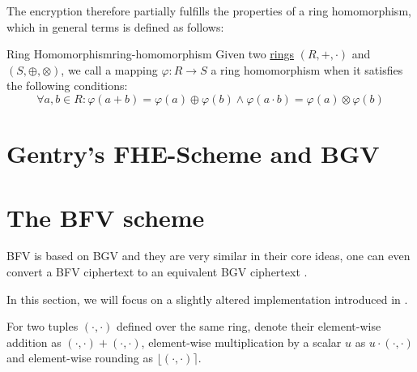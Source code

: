 The encryption therefore partially fulfills the properties of a ring homomorphism, which in general terms is defined as follows:

\begin{definition}{Ring Homomorphism}{ring-homomorphism}
  Given two \hyperref[def:ring]{rings} $(R, +, \cdot)$ and $(S, \oplus, \otimes)$, we call a mapping $\varphi: R \rightarrow S$
  a ring homomorphism when it satisfies the following conditions:
  $$\forall a, b \in R: \varphi(a + b) = \varphi(a) \oplus \varphi(b) \wedge \varphi(a \cdot b) =
    \varphi(a) \otimes \varphi(b)$$
\end{definition}

\section{Gentry's FHE-Scheme and BGV}
\cite{2009-gentry-fhe-original}

\pagebreak
\section{The BFV scheme}
\cite{2012-fv-original}
\cite{2012-brakerski}
BFV is based on BGV and they are very similar in their core ideas, one can even convert a BFV ciphertext to an equivalent BGV ciphertext \parencite{2021-he-revisiting}.

In this section, we will focus on a slightly altered implementation introduced in \cite{2014-fv-comparison}.

For two tuples $(\cdot, \cdot)$ defined over the same ring, denote their element-wise addition as $(\cdot, \cdot) + (\cdot, \cdot)$, element-wise multiplication by a scalar $u$ as $u \cdot (\cdot, \cdot)$ and element-wise rounding as $\lfloor (\cdot, \cdot) \rceil$.

